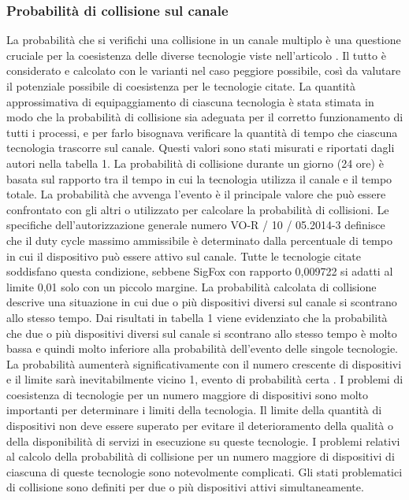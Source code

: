 \documentclass[a4paper]{report} %
\begin{document}
\subsubsection{Probabilità di collisione sul canale}
La probabilità che si verifichi una collisione in un canale multiplo è una questione cruciale per la coesistenza delle diverse tecnologie viste nell'articolo \cite{art:rif.46}. Il tutto è considerato e calcolato con le varianti nel caso peggiore possibile, così da valutare il potenziale possibile di coesistenza per le tecnologie citate. La quantità approssimativa di equipaggiamento di ciascuna tecnologia è stata stimata in modo che la probabilità di collisione sia adeguata per il corretto funzionamento di tutti i processi, e per farlo bisognava verificare la quantità di tempo che ciascuna tecnologia trascorre sul canale. Questi valori sono stati misurati e riportati dagli autori nella tabella 1. La probabilità di collisione durante un giorno (24 ore) è basata sul rapporto tra il tempo in cui la tecnologia utilizza il canale e il tempo totale. La probabilità che avvenga l'evento è il principale valore che può essere confrontato con gli altri o utilizzato per calcolare la probabilità di collisioni. Le specifiche dell'autorizzazione generale numero VO-R / 10 / 05.2014-3  definisce che il duty cycle massimo ammissibile è determinato dalla percentuale di tempo in cui il dispositivo può essere attivo sul canale. Tutte le tecnologie citate soddisfano questa condizione, sebbene SigFox con rapporto 0,009722 si adatti al limite 0,01 solo con un piccolo margine. La probabilità calcolata di collisione descrive una situazione in cui due o più dispositivi diversi sul canale si scontrano allo stesso tempo. Dai risultati in tabella 1 viene evidenziato che la probabilità che due o più dispositivi diversi sul canale si scontrano allo stesso tempo è molto bassa e quindi molto inferiore alla probabilità dell'evento delle singole tecnologie. La probabilità aumenterà significativamente con il numero crescente di dispositivi e il limite sarà inevitabilmente vicino 1, evento di probabilità certa \cite{art:rif.46}.
I problemi di coesistenza di tecnologie per un numero maggiore di dispositivi sono molto importanti per determinare i limiti della tecnologia. Il limite della quantità di dispositivi non deve essere superato per evitare il deterioramento della qualità o della disponibilità di servizi in esecuzione su queste tecnologie. I problemi relativi al calcolo della probabilità di collisione per un numero maggiore di dispositivi di ciascuna di queste tecnologie sono notevolmente complicati. Gli stati problematici di collisione sono definiti per due o più dispositivi attivi simultaneamente. %
\end{document}
